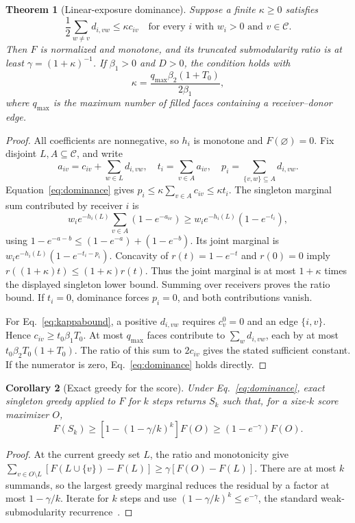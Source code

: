 \documentclass[preprint,11pt,sort&compress]{elsarticle}
\newtheorem{theorem}{Theorem}
\newtheorem{corollary}[theorem]{Corollary}
\begin{document}
\begin{theorem}[Linear-exposure dominance]
\label{thm:proxy}
Suppose a finite $\kappa\ge0$ satisfies
\begin{equation}
 \frac12\sum_{w\ne v}d_{i,vw}\le\kappa c_{iv}
 \quad\text{for every }i\text{ with }w_i>0\text{ and }v\in\mathcal C.
 \label{eq:dominance}
\end{equation}
Then $F$ is normalized and monotone, and its truncated submodularity ratio is at least $\gamma=(1+\kappa)^{-1}$. If $\beta_1>0$ and $D>0$, the condition holds with
\begin{equation}
 \kappa=\frac{q_{\max}\beta_2(1+T_0)}{2\beta_1},\label{eq:kappabound}
\end{equation}
where $q_{\max}$ is the maximum number of filled faces containing a receiver--donor edge.
\end{theorem}
\begin{proof}
All coefficients are nonnegative, so $h_i$ is monotone and $F(\varnothing)=0$. Fix disjoint $L,A\subseteq\mathcal C$, and write
\[
 a_{iv}=c_{iv}+\sum_{w\in L}d_{i,vw},\quad
 t_i=\sum_{v\in A}a_{iv},\quad
 p_i=\sum_{\{v,w\}\subseteq A}d_{i,vw}.
\]
Equation~\ref{eq:dominance} gives $p_i\le\kappa\sum_{v\in A}c_{iv}\le\kappa t_i$. The singleton marginal sum contributed by receiver $i$ is
\[
 w_ie^{-h_i(L)}\sum_{v\in A}(1-e^{-a_{iv}})
 \ge w_ie^{-h_i(L)}(1-e^{-t_i}),
\]
using $1-e^{-a-b}\le(1-e^{-a})+(1-e^{-b})$. Its joint marginal is
$w_ie^{-h_i(L)}(1-e^{-t_i-p_i})$.
Concavity of $r(t)=1-e^{-t}$ and $r(0)=0$ imply
$r((1+\kappa)t)\le(1+\kappa)r(t)$.
Thus the joint marginal is at most $1+\kappa$ times the displayed singleton lower bound. Summing over receivers proves the ratio bound. If $t_i=0$, dominance forces $p_i=0$, and both contributions vanish.

For Eq.~\ref{eq:kappabound}, a positive $d_{i,vw}$ requires $c_v^0=0$ and an edge $\{i,v\}$. Hence $c_{iv}\ge t_0\beta_1T_0$. At most $q_{\max}$ faces contribute to $\sum_wd_{i,vw}$, each by at most $t_0\beta_2T_0(1+T_0)$. The ratio of this sum to $2c_{iv}$ gives the stated sufficient constant. If the numerator is zero, Eq.~\ref{eq:dominance} holds directly.
\end{proof}

\begin{corollary}[Exact greedy for the score]
\label{cor:proxygreedy}
Under Eq.~\ref{eq:dominance}, exact singleton greedy applied to $F$ for $k$ steps returns $S_k$ such that, for a size-$k$ score maximizer $O$,
\begin{equation}
 F(S_k)\ge[1-(1-\gamma/k)^k]F(O)
          \ge(1-e^{-\gamma})F(O).\label{eq:proxyapprox}
\end{equation}
\end{corollary}
\begin{proof}
At the current greedy set $L$, the ratio and monotonicity give
$\sum_{v\in O\setminus L}[F(L\cup\{v\})-F(L)]\ge\gamma[F(O)-F(L)]$.
There are at most $k$ summands, so the largest greedy marginal reduces the residual by a factor at most $1-\gamma/k$. Iterate for $k$ steps and use $(1-\gamma/k)^k\le e^{-\gamma}$, the standard weak-submodularity recurrence~\cite{das2018}.
\end{proof}
\end{document}
